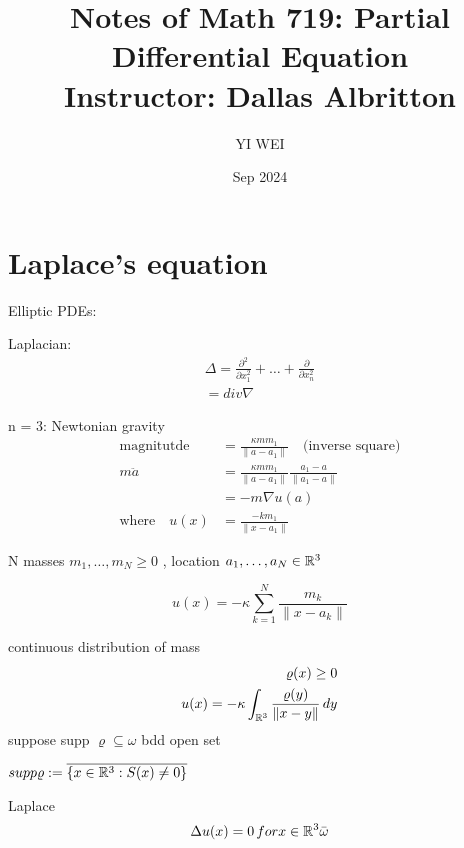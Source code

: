 \documentclass[11pt]{article}
\title{Notes of Math 719: Partial Differential Equation\\Instructor: Dallas Albritton}
\author{YI WEI}
\date{Sep 2024}
\begin{document}
\maketitle
\tableofcontents

\section{Laplace's equation}

Elliptic PDEs:
\begin{example}
    Laplacian:
    \begin{align*}
        \Delta = \frac{\partial^2}{\partial x_1^2} + \dots +  \frac{\partial }{\partial x_n^2}\\
               = div \nabla
    \end{align*}
\end{example}

\begin{example}
    n = 3: Newtonian gravity \\
    \begin{align*}
        \text{magnitutde} &= \frac{\kappa m m_1}{\| a - a_1 \| } \quad \text{(inverse square)} \\
        m\ddot{a} &= \frac{\kappa m m_1}{\| a - a_1 \| }  \frac{a_1 - a}{\| a_1 - a \| } \\
            &= - m\nabla u(a)\\
        \text{where} \quad u(x) &= \frac{-k m_1}{\| x - a_1 \| }
    \end{align*}
\end{example}

N masses $m_1, \ldots , m_{N} \ge 0$ , location $a_1, \ldots , a_{N} \in \mathbb{R}^3$


$$
u(x) = -\kappa \sum_{k=1}^{N} \frac{m_k}{\| x - a_k \| }
$$


\begin{example}
    continuous distribution of mass
    \begin{align*}
        \varrho(x) \ge 0 \\
        u(x) = -\kappa \int_{\mathbb{R}^3} \frac{\varrho(y)}{\| x-y \| } \, dy
    \end{align*}
    suppose supp $\varrho \subseteq \omega$ bdd open set
\end{example}

\remark $supp \varrho := \overline{\{ x \in \mathbb{R}^3: S(x) \neq  0 \}} $

Laplace 
\begin{align*}
    \Delta u(x) = 0 \, for x \in \mathbb{R}^3  \bar{\omega}
\end{align*}
\end{document}
